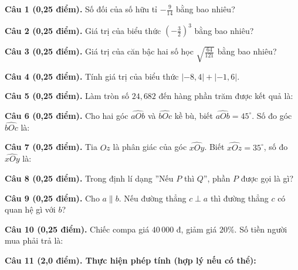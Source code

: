 \documentclass[12pt,a4paper]{article}
\begin{document}
\noindent\textbf{Câu 1 (0,25 điểm).} Số đối của số hữu tỉ $-\frac{9}{14}$ bằng bao nhiêu? \par\vspace{0.5mm}
\noindent\textbf{Câu 2 (0,25 điểm).} Giá trị của biểu thức $\left(-\frac{3}{2}\right)^3$ bằng bao nhiêu? \par\vspace{0.5mm}
\noindent\textbf{Câu 3 (0,25 điểm).} Giá trị của căn bậc hai số học $\sqrt{\frac{64}{121}}$ bằng bao nhiêu? \par\vspace{0.5mm}
\noindent\textbf{Câu 4 (0,25 điểm).} Tính giá trị của biểu thức $\lvert -8{,}4\rvert + \lvert -1{,}6\rvert$. \par\vspace{0.5mm}
\noindent\textbf{Câu 5 (0,25 điểm).} Làm tròn số $24{,}682$ đến hàng phần trăm được kết quả là: \par\vspace{0.5mm}
\noindent\textbf{Câu 6 (0,25 điểm).} Cho hai góc $\widehat{aOb}$ và $\widehat{bOc}$ kề bù, biết $\widehat{aOb}=45^\circ$. Số đo góc $\widehat{bOc}$ là: \par\vspace{0.5mm}
\noindent\textbf{Câu 7 (0,25 điểm).} Tia $Oz$ là phân giác của góc $\widehat{xOy}$. Biết $\widehat{xOz}=35^\circ$, số đo $\widehat{xOy}$ là: \par\vspace{0.5mm}
\noindent\textbf{Câu 8 (0,25 điểm).} Trong định lí dạng ''Nếu $P$ thì $Q$'', phần $P$ được gọi là gì? \par\vspace{0.5mm}
\noindent\textbf{Câu 9 (0,25 điểm).} Cho $a \parallel b$. Nếu đường thẳng $c \perp a$ thì đường thẳng $c$ có quan hệ gì với $b$? \par\vspace{0.5mm}
\noindent\textbf{Câu 10 (0,25 điểm).} Chiếc compa giá $40\,000$ đ, giảm giá $20\%$. Số tiền người mua phải trả là: \par\vspace{0.5mm}
\vspace{0.6mm}

\noindent\textbf{Câu 11 (2,0 điểm). Thực hiện phép tính (hợp lý nếu có thể):}
\vspace{0.8mm}
\end{document}
